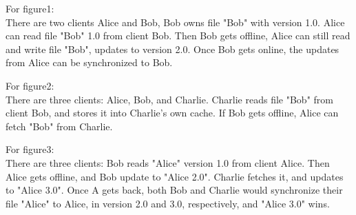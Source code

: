 For figure1:\\
There are two clients Alice and Bob, Bob owns file "Bob" with version 1.0. Alice can read file "Bob" 1.0 from client Bob. Then Bob gets offline, Alice can still read and write file "Bob", updates to version 2.0. Once Bob gets online, the updates from Alice can be synchronized to Bob.

For figure2:\\
There are three clients: Alice, Bob, and Charlie. Charlie reads file "Bob" from client Bob, and stores it into Charlie's own cache. If Bob gets offline, Alice can fetch "Bob" from Charlie.

For figure3:\\
There are three clients: Bob reads "Alice" version 1.0 from client Alice. Then Alice gets offline, and Bob update to "Alice 2.0". Charlie fetches it, and updates to "Alice 3.0". Once A gets back, both Bob and Charlie would synchronize their file "Alice" to Alice, in version 2.0 and 3.0, respectively, and "Alice 3.0" wins.

